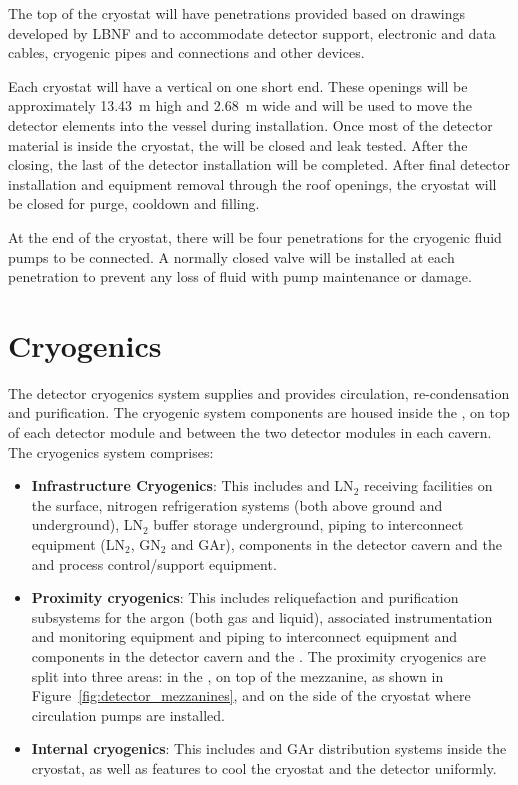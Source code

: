 The top of the cryostat will have penetrations provided based on
drawings developed by LBNF and  to accommodate detector support,
electronic and data cables, cryogenic pipes and connections and other
devices.

Each cryostat will have a vertical  on one short end.
These openings will be approximately \SI{13.43}{\meter} high and
\SI{2.68}{\meter} wide and will be used to move the detector elements
into the vessel during installation.  Once most of the detector
material is inside the cryostat, the  will be closed and
leak tested.  After the  closing, the last of the detector
installation will be completed. After final detector installation and
equipment removal through the roof openings, the cryostat will be
closed for purge, cooldown and filling.

At the  end of the cryostat, there will be four penetrations for
the cryogenic fluid pumps to be connected.  A normally closed valve
will be installed at each penetration to prevent any loss of fluid
with pump maintenance or damage.

\section{Cryogenics}
\label{sec:fdsp-coord-cryogenics}


The detector cryogenics system supplies  and provides
circulation, re-condensation and purification. The cryogenic system
components are housed inside the , on top of each detector module
and between the two detector modules in each cavern. The cryogenics system comprises:
\begin{itemize}
\item {\bf Infrastructure Cryogenics}: This includes  and LN$_2$ receiving
  facilities on the surface, nitrogen refrigeration systems (both
  above ground and underground), LN$_2$ buffer storage
  underground, piping to interconnect equipment (LN$_2$, GN$_2$ and GAr),
  components in the detector cavern and the  and process control/support
  equipment.
\item {\bf Proximity cryogenics}: This includes reliquefaction 
  and purification subsystems for the argon (both gas and liquid), associated
  instrumentation and monitoring equipment and  piping to
  interconnect equipment and components in the detector cavern and the
  . The proximity cryogenics are split into three areas: in the
  , on top of the mezzanine, as shown in Figure~\ref{fig:detector_mezzanines},
  and on the side of the cryostat where  circulation pumps are installed.
\item {\bf Internal cryogenics}: This includes  and GAr distribution
  systems inside the cryostat, as well as features to cool the
  cryostat and the detector uniformly.
\end{itemize}

